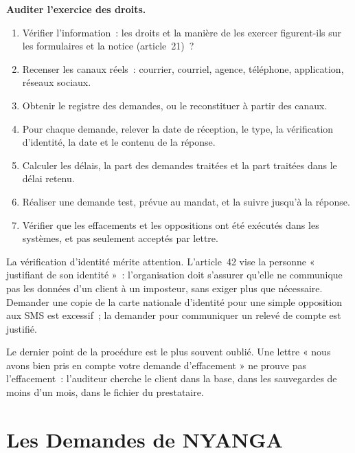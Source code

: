 \begin{boxprocedure}
\textbf{Auditer l'exercice des droits.}
\begin{enumerate}
    \item Vérifier l'information~: les droits et la manière de les exercer
          figurent-ils sur les formulaires et la notice (article~21)~?
    \item Recenser les canaux réels~: courrier, courriel, agence, téléphone,
          application, réseaux sociaux.
    \item Obtenir le registre des demandes, ou le reconstituer à partir des
          canaux.
    \item Pour chaque demande, relever la date de réception, le type, la
          vérification d'identité, la date et le contenu de la réponse.
    \item Calculer les délais, la part des demandes traitées et la part
          traitées dans le délai retenu.
    \item Réaliser une demande test, prévue au mandat, et la suivre jusqu'à
          la réponse.
    \item Vérifier que les effacements et les oppositions ont été exécutés
          dans les systèmes, et pas seulement acceptés par lettre.
\end{enumerate}
\end{boxprocedure}

La vérification d'identité mérite attention. L'article~42 vise la personne
« justifiant de son identité »~: l'organisation doit s'assurer qu'elle ne
communique pas les données d'un client à un imposteur, sans exiger plus que
nécessaire. Demander une copie de la carte nationale d'identité pour une
simple opposition aux SMS est excessif~; la demander pour communiquer un
relevé de compte est justifié.

Le dernier point de la procédure est le plus souvent oublié. Une lettre
« nous avons bien pris en compte votre demande d'effacement » ne prouve pas
l'effacement~: l'auditeur cherche le client dans la base, dans les
sauvegardes de moins d'un mois, dans le fichier du prestataire.

\section{Les Demandes de NYANGA}
\label{sec:c06-nyanga}

